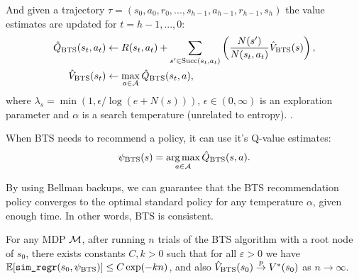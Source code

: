         And given a trajectory $\tau=(s_0,a_0,r_0,...,s_{h-1},a_{h-1},r_{h-1},s_h)$ the value estimates are updated for $t=h-1,...,0$:
        \begin{align}
            {\hat{Q}_{{\textnormal{BTS}}}}(s_t,a_t) &\leftarrow 
                R(s_t,a_t) + \sum_{s' \in {\textnormal{Succ}(s_t,a_t)}} \left( \frac{N(s')}{N(s_t,a_t)} {\hat{V}_{{\textnormal{BTS}}}}(s) \right), 
                        \label{eq:bts_q_backup} \\ 
            {\hat{V}_{{\textnormal{BTS}}}}(s_t) &\leftarrow \max_{a\in\mathcal{A}} {\hat{Q}_{{\textnormal{BTS}}}}(s_t,a), 
                        \label{eq:bts_v_backup} 
        \end{align}
        where $\lambda_s=\min(1,\epsilon/\log(e+N(s)))$, $\epsilon \in (0,\infty)$ is an exploration parameter and $\alpha$ is a search temperature (unrelated to entropy). .


        
        When BTS needs to recommend a policy, it can use it's Q-value estimates:
        \begin{align}
            {\psi_{{\textnormal{BTS}}}}(s)=\operatorname*{arg\,max}_{a\in\mathcal{A}}{\hat{Q}_{{\textnormal{BTS}}}}(s,a).
        \end{align}


        By using 
        Bellman
        backups, we can guarantee that the BTS recommendation policy converges to the optimal standard policy for any temperature $\alpha$, given enough time. In other words, BTS is consistent.
        \begin{theorem} 
            \label{thrm:bts}
            For any MDP $\mathcal{M}$, after running $n$ trials of the BTS algorithm with a root node of $s_0$, there exists constants $C,k>0$ such that for all $\varepsilon>0$ we have $\mathbb{E}[{\textnormal{\texttt{sim\_regr}}}(s_0,{\psi_{{\textnormal{BTS}}}})] \leq C\exp(-kn)$, and also ${\hat{V}_{{\textnormal{BTS}}}}(s_0) \overset{p}{\to} V^*(s_0)$ as $n\rightarrow\infty$.
        \end{theorem}

    
